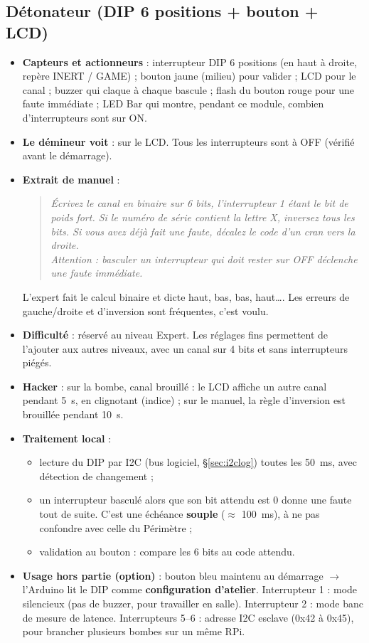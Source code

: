 \documentclass[11pt,a4paper]{article}
\newcommand{\code}[1]{\texttt{\detokenize{#1}}}
\newenvironment{manuel}{\begin{quote}\itshape}{\end{quote}}
\begin{document}
\subsection{Détonateur (DIP 6 positions + bouton + LCD)}
\label{sec:detonateur}

\begin{itemize}
  \item \textbf{Capteurs et actionneurs} : interrupteur DIP 6 positions (en haut à droite, repère \og INERT / GAME\fg{}) ; bouton jaune (milieu) pour valider ; LCD pour le canal ; buzzer qui claque à chaque bascule ; flash du bouton rouge pour une faute immédiate ; LED Bar qui montre, pendant ce module, combien d'interrupteurs sont sur ON.
  \item \textbf{Le démineur voit} : \code{CANAL 27} sur le LCD. Tous les interrupteurs sont à OFF (vérifié avant le démarrage).
  \item \textbf{Extrait de manuel} :
  \begin{manuel}
    Écrivez le canal en binaire sur 6 bits, l'interrupteur 1 étant le bit de poids fort. Si le numéro de série contient la lettre X, inversez tous les bits. Si vous avez déjà fait une faute, décalez le code d'un cran vers la droite.\\
    Attention : basculer un interrupteur qui doit rester sur OFF déclenche une faute immédiate.
  \end{manuel}
  L'expert fait le calcul binaire et dicte \og haut, bas, bas, haut…\fg{}. Les erreurs de gauche/droite et d'inversion sont fréquentes, c'est voulu.
  \item \textbf{Difficulté} : réservé au niveau Expert. Les réglages fins permettent de l'ajouter aux autres niveaux, avec un canal sur 4 bits et sans interrupteurs piégés.
  \item \textbf{Hacker} : sur la bombe, \og canal brouillé\fg{} : le LCD affiche un autre canal pendant 5~s, en clignotant (indice) ; sur le manuel, la règle d'inversion est brouillée pendant 10~s.
  \item \textbf{Traitement local} :
  \begin{itemize}
    \item lecture du DIP par I2C (bus logiciel, \S\ref{sec:i2clog}) toutes les 50~ms, avec détection de changement ;
    \item un interrupteur basculé alors que son bit attendu est 0 donne une faute tout de suite. C'est une échéance \textbf{souple} ($\approx$ 100~ms), à ne pas confondre avec celle du Périmètre ;
    \item validation au bouton : compare les 6 bits au code attendu.
  \end{itemize}
  \item \textbf{Usage hors partie (option)} : bouton bleu maintenu au démarrage $\to$ l'Arduino lit le DIP comme \textbf{configuration d'atelier}. Interrupteur 1 : mode silencieux (pas de buzzer, pour travailler en salle). Interrupteur 2 : mode banc de mesure de latence. Interrupteurs 5--6 : adresse I2C esclave (0x42 à 0x45), pour brancher plusieurs bombes sur un même RPi.
\end{itemize}
\end{document}
